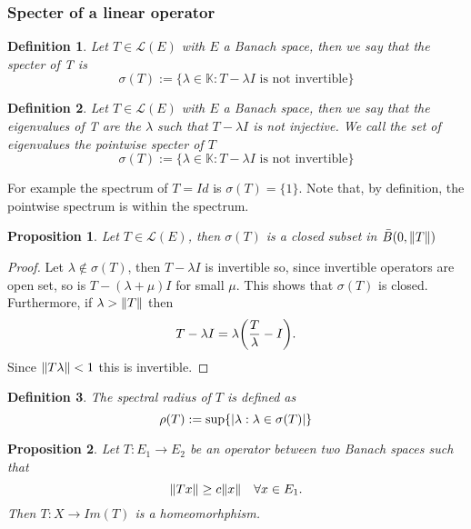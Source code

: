 \documentclass[12pt]{article}
\newtheorem{proposition}{Proposition}
\newtheorem{definition}{Definition}
\begin{document}
\subsubsection{Specter of a linear operator}
\begin{definition}
    Let $T\in\mathcal{L}(E)$ with $E$ a Banach space, then we say that the \emph{specter of T} is
    \begin{equation*}
        \sigma(T):=\{\lambda\in\mathbb{K}: T-\lambda I \text{ is not invertible}\}
    \end{equation*}
\end{definition}
\begin{definition}
    Let $T\in\mathcal{L}(E)$ with $E$ a Banach space, then we say that the \emph{eigenvalues of T} are the $\lambda$ such that $T-\lambda I$ is not injective. We call the set of eigenvalues the \emph{pointwise specter} of $T$
    \begin{equation*}
        \sigma(T):=\{\lambda\in\mathbb{K}: T-\lambda I \text{ is not invertible}\}
    \end{equation*}
\end{definition}
For example the spectrum of $T=Id$ is $\sigma(T)=\{1\}$. Note that, by definition, the pointwise spectrum is within the spectrum.
\begin{proposition}
    Let $T\in\mathcal{L}(E)$, then $\sigma(T)$ is a closed subset in $\bar{B}(0,\norm{T})$
\end{proposition}
\begin{proof}
    Let $\lambda\notin \sigma(T)$, then $T-\lambda I$ is invertible so, since invertible operators are open set, so is  $T-(\lambda+\mu) I$ for small $\mu$. This shows that $\sigma(T)$ is closed. Furthermore, if $\lambda>\norm{T}$ then
    \begin{equation*}
        T-\lambda I=\lambda \qty(\frac{T}{\lambda}-I).
    \end{equation*}
    Since $\norm{T\lambda}<1$ this is invertible.
\end{proof}
\begin{definition}
    The spectral radius of $T$ is defined as
    \begin{equation*}
        \rho(T):=\sup\{\abs{\lambda:\lambda\in\sigma(T)}\}
    \end{equation*}
\end{definition}
\begin{proposition}
    Let $T:E_1\to E_2$ be an operator between two Banach spaces such that
    \begin{equation*}
        \norm{Tx}\geq c\norm{x}\quad\forall x\in E_1.
    \end{equation*}
    Then $T:X\to Im(T)$ is a homeomorhphism.
\end{proposition}
\end{document}
